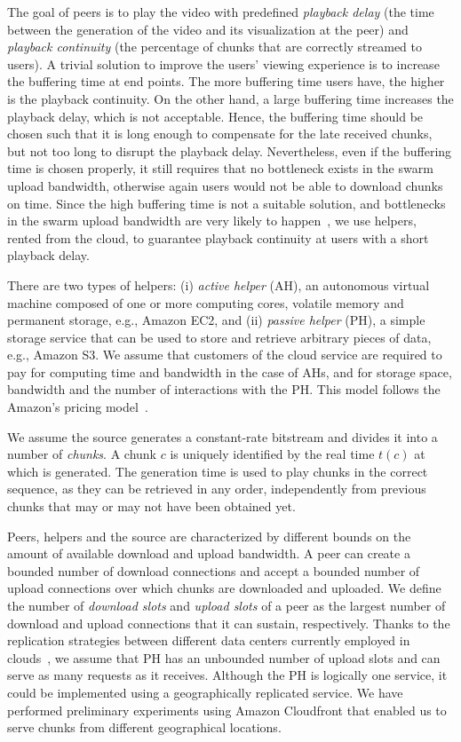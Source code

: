 The goal of \clive peers is to play the video with predefined \emph{playback delay} (the time between the generation of the video and its visualization at the peer) and \emph{playback continuity} (the percentage of chunks that are correctly streamed to users). A trivial solution to improve the users' viewing experience is to increase the buffering time at end points. The more buffering time users have, the higher is the playback continuity. On the other hand, a large buffering time increases the playback delay, which is not acceptable. Hence, the buffering time should be chosen such that it is long enough to compensate for the late received chunks, but not too long to disrupt the playback delay. Nevertheless, even if the buffering time is chosen properly, it still requires that no bottleneck exists in the swarm upload bandwidth, otherwise again users would not be able to download chunks on time. Since the high buffering time is not a suitable solution, and bottlenecks in the swarm upload bandwidth are very 
likely to happen~\cite{Kumar:MDT}, we use helpers, rented from the cloud, to guarantee playback continuity at users with a short playback delay.


There are two types of helpers: (i) \emph{active helper} (AH), an
autonomous virtual machine composed of one or more computing cores, volatile
memory and permanent storage, e.g., Amazon EC2, and (ii) \emph{passive
helper} (PH), a simple storage service that can be used to store and
retrieve arbitrary pieces of data, e.g., Amazon S3. We assume that
customers of the cloud service are required to pay for computing time and
bandwidth in the case of AHs, and for storage space, bandwidth and the number
of interactions with the PH. This model follows the Amazon's
pricing model~\cite{amazonec2,amazons3}.

We assume the source generates a constant-rate bitstream and divides it into a
number of \emph{chunks}. A chunk $c$ is uniquely identified by the real time
$t(c)$ at which is generated. The generation time is used to play chunks in
the correct sequence, as they can be retrieved in any order, independently from
previous chunks that may or may not have been obtained yet.

Peers, helpers and the source are characterized by different bounds on the
amount of available download and upload bandwidth. A peer can create a bounded
number of download connections and accept a bounded number of upload
connections over which chunks are downloaded and uploaded. We define the
number of {\em download slots} and {\em upload slots} of a peer as the
largest number of download and upload connections that it can sustain, respectively. 
Thanks to the replication strategies between different data centers currently employed in
clouds~\cite{goel2006data}, we assume that PH has an unbounded number of
upload slots and can serve as many requests as it receives. Although the PH is logically one service, it could be implemented using  a geographically replicated service. We have performed preliminary experiments using Amazon Cloudfront that enabled us to serve chunks from different geographical locations.

